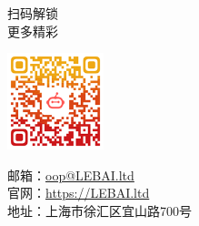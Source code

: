 
\centering



扫码解锁\\
更多精彩

\vfill

\includegraphics[width=2.8cm]{image/qrcode.png}

\vfill

邮箱：\url{oop@LEBAI.ltd}\\
官网：\url{https://LEBAI.ltd}\\
地址：上海市徐汇区宜山路700号

